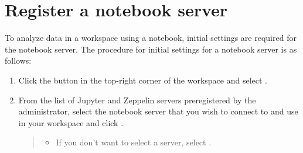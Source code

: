 \documentclass[letterpaper,10pt,english]{sphinxmanual}
\begin{document}
\section{Register a notebook server}
\label{\detokenize{discovery/part05/register_a_notebook_server:id1}}\label{\detokenize{discovery/part05/register_a_notebook_server::doc}}
To analyze data in a workspace using a notebook, initial settings are required for the notebook server. The procedure for initial settings for a notebook server is as follows:
\begin{enumerate}
\def\theenumi{\arabic{enumi}}
\def\labelenumi{\theenumi .}
\makeatletter\def\p@enumii{\p@enumi \theenumi .}\makeatother
\item {} 
Click the  button in the top-right corner of the workspace and select .
\begin{quote}

\begin{figure}[H]
\centering

\noindent{}
\end{figure}
\end{quote}

\item {} 
From the list of Jupyter and Zeppelin servers preregistered by the administrator, select the notebook server that you wish to connect to and use in your workspace and click .
\begin{quote}
\begin{itemize}
\item {} 
If you don’t want to select a server, select .

\end{itemize}

\begin{figure}[H]
\centering

\noindent{}
\end{figure}
\end{quote}

\end{enumerate}
\end{document}
